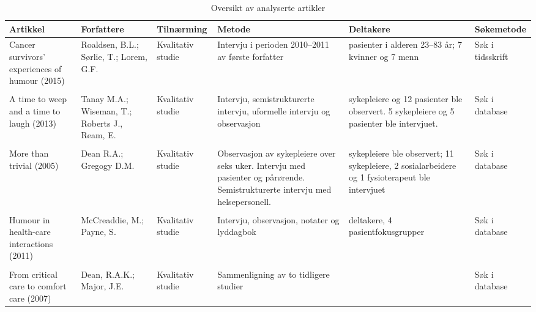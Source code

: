\begin{landscape}
  \begin{table}
    \centering
    \small
    \begin{tabularx}{\paperwidth}{
        >{\raggedright\arraybackslash}X
        >{\raggedright\arraybackslash}X
        l
        >{\raggedright\arraybackslash}X
        >{\raggedright\arraybackslash}X
        l}
      \toprule
      \textbf{Artikkel} &
      \textbf{Forfattere} &
      \textbf{Tilnærming} &
      \textbf{Metode} &
      \textbf{Deltakere} &
      \textbf{Søkemetode} \\
      \midrule
      Cancer survivors’ experiences of humour (2015) &
      Roaldsen, B.L.; S{\o}rlie, T.; Lorem, G.F. &
      Kvalitativ studie &
      Intervju i perioden 2010--2011 av første forfatter &
      14 pasienter i alderen 23--83 år; 7 kvinner og 7 menn &
      Søk i tidsskrift
      \\ \\
      A time to weep and a time to laugh (2013) &
      Tanay M.A.; Wiseman, T.; Roberts J., Ream, E. &
      Kvalitativ studie &
      Intervju, semistrukturerte intervju, uformelle intervju og observasjon &
      9 sykepleiere og 12 pasienter ble observert. 5 sykepleiere og 5 pasienter ble intervjuet. &
      Søk i database
      \\ \\
      More than trivial (2005) &
      Dean R.A.; Gregogy D.M. &
      Kvalitativ studie &
      Observasjon av sykepleiere over seks uker. Intervju med
      pasienter og pårørende. Semistrukturerte intervju med helsepersonell. &
      6 sykepleiere ble observert; 11 sykepleiere, 2
      sosialarbeidere og 1 fysioterapeut ble intervjuet &
      Søk i database
      \\ \\
      Humour in health-care interactions (2011) &
      McCreaddie, M.; Payne, S. &
      Kvalitativ studie &
      Intervju, observasjon, notater og lyddagbok &
      32 deltakere, 4 pasientfokusgrupper &
      Søk i database
      \\ \\
      From critical care to comfort care (2007) &
      Dean, R.A.K.; Major, J.E. &
      Kvalitativ studie &
      Sammenligning av to tidligere studier &
      &
      Søk i database \\
      \bottomrule
    \end{tabularx}
    \label{tabell.artikler}
    \caption{Oversikt av analyserte artikler}
  \end{table}
\end{landscape}
